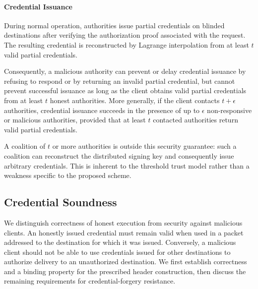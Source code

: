 \paragraph{Credential Issuance}
During normal operation, authorities issue partial credentials on blinded destinations after verifying the authorization proof associated with the request. 
The resulting credential is reconstructed by Lagrange interpolation from at least $t$ valid partial credentials.

Consequently, a malicious authority can prevent or delay credential issuance by refusing to respond or by returning an invalid partial credential, 
but cannot prevent successful issuance as long as the client obtains valid partial credentials from at least $t$ honest authorities. 
More generally, if the client contacts $t+\epsilon$ authorities, credential issuance succeeds in the presence of up to $\epsilon$ non-responsive or malicious authorities, 
provided that at least $t$ contacted authorities return valid partial credentials.

A coalition of $t$ or more authorities is outside this security guarantee: 
such a coalition can reconstruct the distributed signing key and consequently issue arbitrary credentials. 
This is inherent to the threshold trust model rather than a weakness specific to the proposed scheme.


\subsection{Credential Soundness}

We distinguish correctness of honest execution from security against malicious clients. 
An honestly issued credential must remain valid when used in a packet addressed to the destination for which it was issued. 
Conversely, a malicious client should not be able to use credentials issued for other destinations to authorize delivery to an unauthorized destination. 
We first establish correctness and a binding property for the prescribed header construction, then discuss the remaining requirements for credential-forgery resistance.


